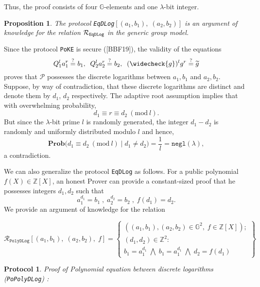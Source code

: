 \documentclass[11pt, lettersize, notitlepage, leqno, footskip=0.6cm]{article}
\newcommand{\bz}{\mathbb Z}
\newcommand{\ttt}{\texttt}
\newcommand{\negl}{\ttt{{negl}}}
\newcommand{\wti}{\widetilde}
\newcommand{\mc}{\mathcal}
\newcommand{\mb}{\mathbb}
\newcommand{\mbf}{\mathbf}
\newcommand{\lam}{\lambda}
\newcommand{\lamb}{\lambda}
\newcommand{\weck}{\widecheck}
\newcommand{\Prob}{\mbf{Prob}}
\newcommand{\vs}{\vspace{-0.15cm}}
\newcommand{\noin}{\noindent}
\newcommand{\op}{overwhelming probability}
\newcommand{\Mod}[1]{\ (\mathrm{mod}\ #1)}
\newtheorem{Prop}[Thm]{Proposition}
\newtheorem{Prot}[Thm]{Protocol}
\numberwithin{equation}{section}
\begin{document}
\noin Thus, the proof consists of four $\mb{G}$-elements and one $\lam$-bit integer. 

\begin{Prop} The protocol \verb|EqDLog|$[(a_1, b_1),\; (a_2, b_2)]$ is an argument of knowledge for the relation $\mc{R}_{{\tt{{EqDLog}}}}$ in the generic group model.\end{Prop}

\begin{prf} Since the protocol \verb|PoKE| is secure ([BBF19]), the validity of the equations \vs $$Q_1^la_1^r \stackrel{?}{=}  b_1, \;\; Q_2^la_2^r \stackrel{?}{=} b_2, \;\; (\weck{g})^l g^r \stackrel{?}{=} \wti{g}$$ proves that $\mc{P}$ possesses the discrete logarithms between $a_1, b_1$ and $a_2, b_2$. Suppose, by way of contradiction, that these discrete logarithms are distinct and denote them by $d_1$, $d_2$ respectively. The adaptive root assumption implies that with \op,\vs $$d_1 \equiv r\equiv d_2 \Mod{l}.$$ But since the $\lamb$-bit prime $l$ is randomly generated, the integer $d_1-d_2$ is randomly and uniformly distributed modulo $l$ and hence, \vs $$ \Prob\big( d_1\equiv d_2\Mod{l}\; \Big|\; d_1\neq d_2    \big) = \frac{1}{l} =\negl(\lamb),$$ a contradiction.\end{prf}

\vspace{0.2cm}



\noindent We can also generalize the protocol \verb|EqDLog| as follows. For a public polynomial {$f(X)\in \bz[X]$}, an honest Prover can provide a constant-sized proof that he possesses integers $d_1,d_2$ such that \vs $$a_1^{d_1} = b_1\;,\;a_2^{d_2} = b_2\;,\;f(d_1) = d_2.$$ We provide an argument of knowledge for the relation 

\[
  \mc{R}_{{\ttt{PolyDLog}}}[(a_1, b_1),\;(a_2,b_2),\;f] = \left\{\begin{array}{l}
    ((a_1, b_1), (a_2,b_2)\in\mb{G}^2,\;f\in\bz[X]);\\
    (d_1, d_2)\in\mb{Z}^2: \\
    b_1 = a_1^{d_1}\; \bigwedge\; b_1 = a_1^{d_1}\; \bigwedge \;d_2 = f(d_1)
  \end{array}\right\}
\] 

\vspace{0.2cm}


\begin{Prot} \normalfont \textit{Proof of Polynomial equation between discrete logarithms} (\verb|PoPolyDLog|) :\end{Prot} \vspace{-0.3cm}
\end{document}
